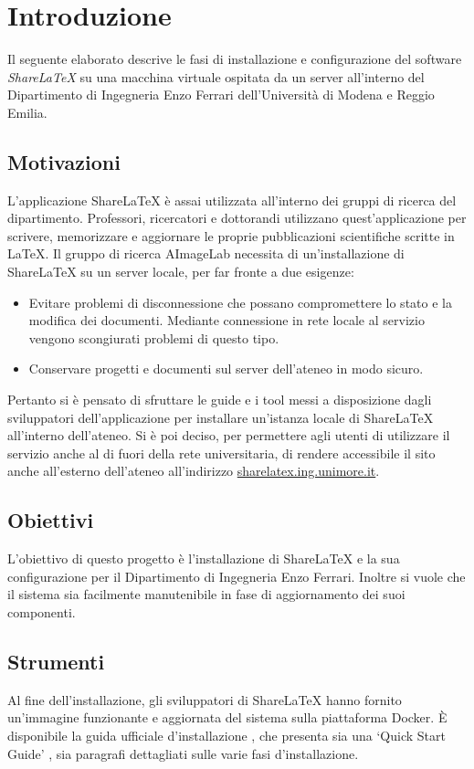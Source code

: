 \chapter{Introduzione}
\label{Introduzione}
\thispagestyle{empty}

Il seguente elaborato descrive le fasi di installazione e configurazione del software \emph{ShareLaTeX} su una macchina virtuale ospitata da un server all'interno del Dipartimento di Ingegneria Enzo Ferrari dell'Università di Modena e Reggio Emilia.

\section{Motivazioni}
L'applicazione ShareLaTeX è assai utilizzata all'interno dei gruppi di ricerca del dipartimento. Professori, ricercatori e dottorandi utilizzano quest'applicazione per scrivere, memorizzare e aggiornare le proprie pubblicazioni scientifiche scritte in \LaTeX. Il gruppo di ricerca AImageLab necessita di un'installazione di ShareLaTeX su un server locale, per far fronte a due esigenze:
\begin{itemize}
    \item Evitare problemi di disconnessione che possano compromettere lo stato e la modifica dei documenti. Mediante connessione in rete locale al servizio vengono scongiurati problemi di questo tipo.
    \item Conservare progetti e documenti sul server dell'ateneo in modo sicuro.
\end{itemize}
Pertanto si è pensato di sfruttare le guide e i tool messi a disposizione dagli sviluppatori dell'applicazione per installare un'istanza locale di ShareLaTeX all'interno dell'ateneo. Si è poi deciso, per permettere agli utenti di utilizzare il servizio anche al di fuori della rete universitaria, di rendere accessibile il sito anche all'esterno dell'ateneo all'indirizzo \url{sharelatex.ing.unimore.it}.

\section{Obiettivi}
L'obiettivo di questo progetto è l'installazione di ShareLaTeX e la sua configurazione per il Dipartimento di Ingegneria Enzo Ferrari. Inoltre si vuole che il sistema sia facilmente manutenibile in fase di aggiornamento dei suoi componenti.

\section{Strumenti}
Al fine dell'installazione, gli sviluppatori di ShareLaTeX hanno fornito un'immagine funzionante e aggiornata del sistema sulla piattaforma Docker. È disponibile la guida ufficiale d'installazione \cite{sharelatex_wiki}, che presenta sia una \enquote*{Quick Start Guide} \cite{sharelatex_qsg}, sia paragrafi dettagliati sulle varie fasi d'installazione.

